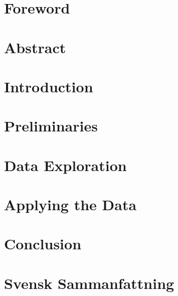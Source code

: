 \documentclass[a4paper, 12pt, oneside]{book}
\begin{document}

\tableofcontents 


\endgroup %

\clearpage
\pagestyle{plain}      
\chapter*{Foreword}


\chapter*{Abstract}


%

\chapter{Introduction}

\chapter{Preliminaries}
 

\chapter{Data Exploration}


\chapter{Applying the Data}


\chapter{Conclusion}


\chapter*{Svensk Sammanfattning}

\end{document}
